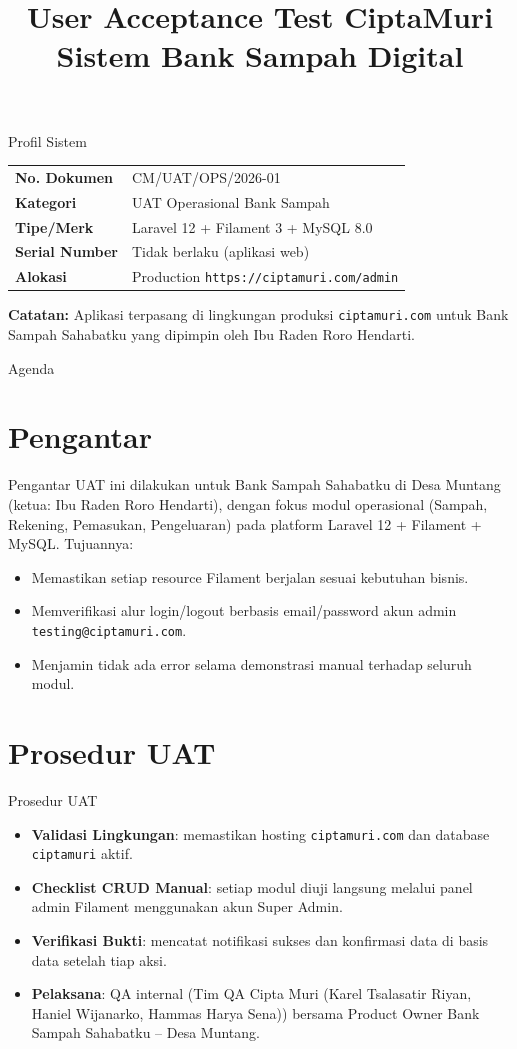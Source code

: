 \documentclass[aspectratio=169]{beamer}
\title{User Acceptance Test CiptaMuri\\Sistem Bank Sampah Digital}
\subtitle{\ProjectName}
\author{\Vendor}
\date{\TestYear}
\newcommand{\DocumentNumber}{CM/UAT/OPS/2026-01}
\newcommand{\DeviceCategory}{UAT Operasional Bank Sampah}
\newcommand{\DeviceType}{Laravel 12 + Filament 3 + MySQL 8.0}
\newcommand{\SerialNumber}{Tidak berlaku (aplikasi web)}
\newcommand{\Allocation}{Production \texttt{https://ciptamuri.com/admin}}
\newcommand{\Vendor}{Tim QA Cipta Muri (Karel Tsalasatir Riyan, Haniel Wijanarko, Hammas Harya Sena)}
\newcommand{\Client}{Bank Sampah Sahabatku -- Desa Muntang}
\begin{document}
\frame{\titlepage}

\begin{frame}{Profil Sistem}
  \begin{tabular}{@{}p{4cm}p{7cm}@{}}
    \textbf{No. Dokumen} & \DocumentNumber \\
    \textbf{Kategori} & \DeviceCategory \\
    \textbf{Tipe/Merk} & \DeviceType \\
    \textbf{Serial Number} & \SerialNumber \\
    \textbf{Alokasi} & \Allocation \\
  \end{tabular}
\vspace{0.5cm}

\textbf{Catatan:} Aplikasi terpasang di lingkungan produksi \texttt{ciptamuri.com} untuk Bank Sampah Sahabatku yang dipimpin oleh Ibu Raden Roro Hendarti.
\end{frame}

\begin{frame}{Agenda}
  \tableofcontents
\end{frame}

\section{Pengantar}
\begin{frame}{Pengantar}
  UAT ini dilakukan untuk Bank Sampah Sahabatku di Desa Muntang (ketua: Ibu Raden Roro Hendarti), dengan fokus modul operasional (Sampah, Rekening, Pemasukan, Pengeluaran) pada platform Laravel 12 + Filament + MySQL. Tujuannya:
  \begin{itemize}
    \item Memastikan setiap resource Filament berjalan sesuai kebutuhan bisnis.
    \item Memverifikasi alur login/logout berbasis email/password akun admin \texttt{testing@ciptamuri.com}.
    \item Menjamin tidak ada error selama demonstrasi manual terhadap seluruh modul.
  \end{itemize}
\end{frame}

\section{Prosedur UAT}
\begin{frame}{Prosedur UAT}
  \begin{itemize}
    \item \textbf{Validasi Lingkungan}: memastikan hosting \texttt{ciptamuri.com} dan database \texttt{ciptamuri} aktif.
    \item \textbf{Checklist CRUD Manual}: setiap modul diuji langsung melalui panel admin Filament menggunakan akun Super Admin.
    \item \textbf{Verifikasi Bukti}: mencatat notifikasi sukses dan konfirmasi data di basis data setelah tiap aksi.
    \item \textbf{Pelaksana}: QA internal (\Vendor) bersama Product Owner \Client.
  \end{itemize}
\end{frame}
\end{document}
